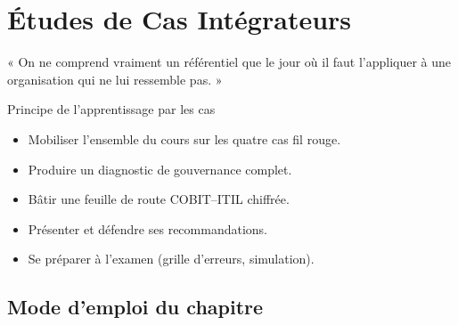 
\chapter{Études de Cas Intégrateurs}
\label{chap:cas-integrateurs}

\epigraph{%
    « On ne comprend vraiment un référentiel que le jour où il faut
    l'appliquer à une organisation qui ne lui ressemble pas. »%
}{Principe de l'apprentissage par les cas}


\begin{boxobjectifs}
\begin{itemize}
    \item Mobiliser l'ensemble du cours sur les quatre cas fil rouge.
    \item Produire un diagnostic de gouvernance complet.
    \item Bâtir une feuille de route COBIT--ITIL chiffrée.
    \item Présenter et défendre ses recommandations.
    \item Se préparer à l'examen (grille d'erreurs, simulation).
\end{itemize}
\end{boxobjectifs}

\bigskip

\section*{Mode d'emploi du chapitre}

